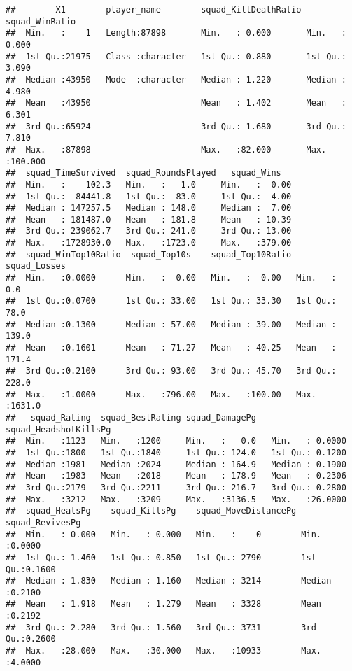 \documentclass[]{article}
\begin{document}
\begin{verbatim}
##        X1        player_name        squad_KillDeathRatio squad_WinRatio   
##  Min.   :    1   Length:87898       Min.   : 0.000       Min.   :  0.000  
##  1st Qu.:21975   Class :character   1st Qu.: 0.880       1st Qu.:  3.090  
##  Median :43950   Mode  :character   Median : 1.220       Median :  4.980  
##  Mean   :43950                      Mean   : 1.402       Mean   :  6.301  
##  3rd Qu.:65924                      3rd Qu.: 1.680       3rd Qu.:  7.810  
##  Max.   :87898                      Max.   :82.000       Max.   :100.000  
##  squad_TimeSurvived  squad_RoundsPlayed   squad_Wins    
##  Min.   :    102.3   Min.   :   1.0     Min.   :  0.00  
##  1st Qu.:  84441.8   1st Qu.:  83.0     1st Qu.:  4.00  
##  Median : 147257.5   Median : 148.0     Median :  7.00  
##  Mean   : 181487.0   Mean   : 181.8     Mean   : 10.39  
##  3rd Qu.: 239062.7   3rd Qu.: 241.0     3rd Qu.: 13.00  
##  Max.   :1728930.0   Max.   :1723.0     Max.   :379.00  
##  squad_WinTop10Ratio  squad_Top10s    squad_Top10Ratio  squad_Losses   
##  Min.   :0.0000      Min.   :  0.00   Min.   :  0.00   Min.   :   0.0  
##  1st Qu.:0.0700      1st Qu.: 33.00   1st Qu.: 33.30   1st Qu.:  78.0  
##  Median :0.1300      Median : 57.00   Median : 39.00   Median : 139.0  
##  Mean   :0.1601      Mean   : 71.27   Mean   : 40.25   Mean   : 171.4  
##  3rd Qu.:0.2100      3rd Qu.: 93.00   3rd Qu.: 45.70   3rd Qu.: 228.0  
##  Max.   :1.0000      Max.   :796.00   Max.   :100.00   Max.   :1631.0  
##   squad_Rating  squad_BestRating squad_DamagePg   squad_HeadshotKillsPg
##  Min.   :1123   Min.   :1200     Min.   :   0.0   Min.   : 0.0000      
##  1st Qu.:1800   1st Qu.:1840     1st Qu.: 124.0   1st Qu.: 0.1200      
##  Median :1981   Median :2024     Median : 164.9   Median : 0.1900      
##  Mean   :1983   Mean   :2018     Mean   : 178.9   Mean   : 0.2306      
##  3rd Qu.:2179   3rd Qu.:2211     3rd Qu.: 216.7   3rd Qu.: 0.2800      
##  Max.   :3212   Max.   :3209     Max.   :3136.5   Max.   :26.0000      
##  squad_HealsPg    squad_KillsPg    squad_MoveDistancePg squad_RevivesPg 
##  Min.   : 0.000   Min.   : 0.000   Min.   :    0        Min.   :0.0000  
##  1st Qu.: 1.460   1st Qu.: 0.850   1st Qu.: 2790        1st Qu.:0.1600  
##  Median : 1.830   Median : 1.160   Median : 3214        Median :0.2100  
##  Mean   : 1.918   Mean   : 1.279   Mean   : 3328        Mean   :0.2192  
##  3rd Qu.: 2.280   3rd Qu.: 1.560   3rd Qu.: 3731        3rd Qu.:0.2600  
##  Max.   :28.000   Max.   :30.000   Max.   :10933        Max.   :4.0000  

\end{verbatim}
\end{document}
